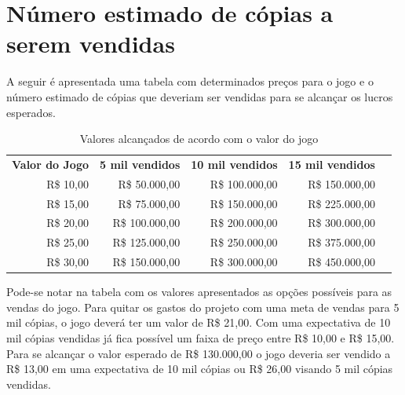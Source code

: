 \documentclass[11pt]{article} %
\begin{document}
\section{Número estimado de cópias a serem vendidas}

A seguir é apresentada uma tabela com determinados preços para o jogo e o número estimado de cópias que deveriam ser vendidas para se alcançar os lucros esperados.

\begin{table}[h]
\centering
\begin{tabular}{|l|l|l|l|l}
\cline{1-4}
\multicolumn{1}{|c|}{\textbf{Valor do Jogo}} & \multicolumn{1}{c|}{\textbf{5 mil vendidos}} & \multicolumn{1}{c|}{\textbf{10 mil vendidos}} & \multicolumn{1}{c|}{\textbf{15 mil vendidos}} &  \\ \cline{1-4}
\multicolumn{1}{|r|}{R\$ 10,00}              & \multicolumn{1}{r|}{R\$ 50.000,00}           & \multicolumn{1}{r|}{R\$ 100.000,00}           & \multicolumn{1}{r|}{R\$ 150.000,00}           &  \\ \cline{1-4}
\multicolumn{1}{|r|}{R\$ 15,00}              & \multicolumn{1}{r|}{R\$ 75.000,00}           & \multicolumn{1}{r|}{R\$ 150.000,00}           & \multicolumn{1}{r|}{R\$ 225.000,00}           &  \\ \cline{1-4}
\multicolumn{1}{|r|}{R\$ 20,00}              & \multicolumn{1}{r|}{R\$ 100.000,00}          & \multicolumn{1}{r|}{R\$ 200.000,00}           & \multicolumn{1}{r|}{R\$ 300.000,00}           &  \\ \cline{1-4}
\multicolumn{1}{|r|}{R\$ 25,00}              & \multicolumn{1}{r|}{R\$ 125.000,00}          & \multicolumn{1}{r|}{R\$ 250.000,00}           & \multicolumn{1}{r|}{R\$ 375.000,00}           &  \\ \cline{1-4}
\multicolumn{1}{|r|}{R\$ 30,00}              & \multicolumn{1}{r|}{R\$ 150.000,00}          & \multicolumn{1}{r|}{R\$ 300.000,00}           & \multicolumn{1}{r|}{R\$ 450.000,00}           &  \\ \cline{1-4}
\end{tabular}
\caption{Valores alcançados de acordo com o valor do jogo}
\end{table}

Pode-se notar na tabela com os valores apresentados as opções possíveis para as vendas do jogo. Para quitar os gastos do projeto com uma meta de vendas para 5 mil cópias, o jogo deverá ter um valor de R\$ 21,00. Com uma expectativa de 10 mil cópias vendidas já fica possível um faixa de preço entre R\$ 10,00 e R\$ 15,00. Para se alcançar o valor esperado de R\$ 130.000,00 o jogo deveria ser vendido a R\$ 13,00 em uma expectativa de 10 mil cópias ou R\$ 26,00 visando 5 mil cópias vendidas.
\end{document}
